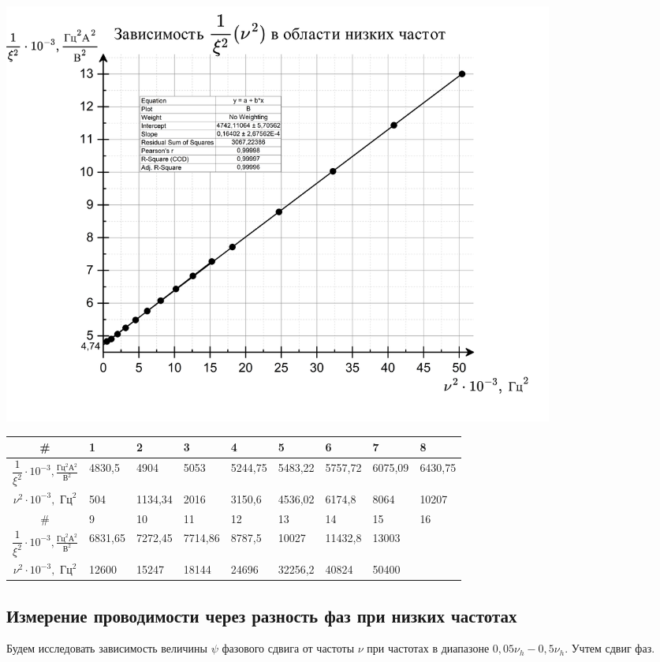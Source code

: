 \documentclass[a4paper,12pt]{article}
\theoremstyle{plain} %
\theoremstyle{definition} %
\theoremstyle{remark} %
\begin{document}
	\includegraphics[width = 0.8\textwidth]{xi1}
	
		\begin{table}[h]
		\begin{tabularx}{\textwidth}{|c|Y|Y|Y|Y|Y|Y|Y|Y|}
			\hline
			\# & 1 & 2 & 3 & 4 & 5 & 6 & 7 & 8 \\
			\hline
			$\dfrac{1}{\xi^2}\cdot 10^{-3}, \frac{\text{Гц}^2 \text{А}^2}{\text{В}^2}$ & 4830,5&		4904&			5053&	5244,75&			5483,22&			5757,72&			6075,09&			6430,75 \\	\hline
			$\nu^2 \cdot 10^{-3}, \text{ Гц}^2$ & 504&			1134,34&			2016&			3150,6&			4536,02&			6174,8&			8064&			10207	 \\ \hline
			\hline
			\# & 9& 10 & 11 & 12 & 13 & 14 & 15 & 16 \\
			\hline
			$\dfrac{1}{\xi^2}\cdot 10^{-3}, \frac{\text{Гц}^2 \text{А}^2}{\text{В}^2}$ & 6831,65 & 			7272,45&			7714,86&			8787,5&			10027&			11432,8&			13003& \\	\hline
			$\nu^2 \cdot 10^{-3}, \text{ Гц}^2$ & 12600& 15247&			18144&			24696&			32256,2&			40824&			50400 &\\ \hline
			
				\end{tabularx}
		\label{tab:my-table1}
	\end{table}
	
	\subsection{Измерение проводимости через разность фаз при низких частотах}
	
	Будем исследовать зависимость величины   $\psi$  фазового сдвига  от частоты  $\nu$  при частотах в диапазоне $0,05 \nu_h - 0,5 \nu_h$. Учтем сдвиг фаз. 
	
\end{document}
